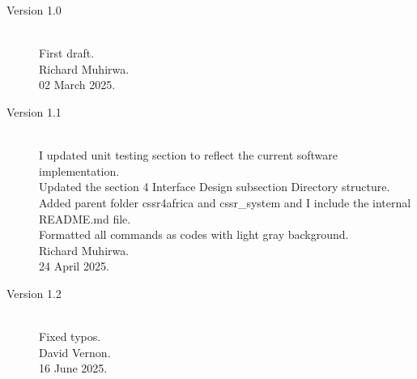 \documentclass{CSSRforAfrica}
\begin{document}
\begin{description}

\item [Version 1.0]~\\
First draft. \\
Richard  Muhirwa. \\        
02 March 2025.               

\item [Version 1.1]~\\
I updated unit testing section to reflect the current software implementation. \\
Updated the section 4 Interface Design subsection Directory structure. Added parent folder cssr4africa and cssr\_system and I include the internal README.md file.\\
Formatted all commands as codes with light gray background.\\
Richard  Muhirwa. \\    
24 April 2025.

\item [Version 1.2]~\\
Fixed typos. \\
David Vernon. \\        
16 June 2025.    

\end{description}
\end{document}
